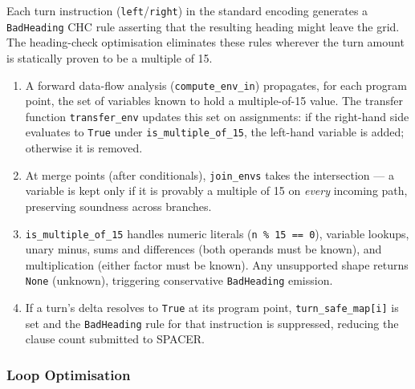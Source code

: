 Each turn instruction (\texttt{left}/\texttt{right}) in the standard encoding generates a \texttt{BadHeading} CHC rule asserting that the resulting heading might leave the grid. The heading-check optimisation eliminates these rules wherever the turn amount is statically proven to be a multiple of 15.
\begin{enumerate}[leftmargin=1.5em, noitemsep, topsep=2pt]
    \item A forward data-flow analysis (\texttt{compute\_env\_in}) propagates, for each program point, the set of variables known to hold a multiple-of-15 value. The transfer function \texttt{transfer\_env} updates this set on assignments: if the right-hand side evaluates to \texttt{True} under \texttt{is\_multiple\_of\_15}, the left-hand variable is added; otherwise it is removed.
    \item At merge points (after conditionals), \texttt{join\_envs} takes the intersection — a variable is kept only if it is provably a multiple of 15 on \emph{every} incoming path, preserving soundness across branches.
    \item \texttt{is\_multiple\_of\_15} handles numeric literals (\texttt{n \% 15 == 0}), variable lookups, unary minus, sums and differences (both operands must be known), and multiplication (either factor must be known). Any unsupported shape returns \texttt{None} (unknown), triggering conservative \texttt{BadHeading} emission.
    \item If a turn's delta resolves to \texttt{True} at its program point, \texttt{turn\_safe\_map[i]} is set and the \texttt{BadHeading} rule for that instruction is suppressed, reducing the clause count submitted to SPACER.
\end{enumerate}
\newpage
\subsubsection*{Loop Optimisation}

